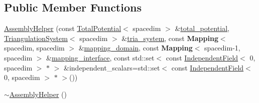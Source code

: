 \subsection*{Public Member Functions}
\begin{DoxyCompactItemize}
\item 
\hyperlink{class_assembly_helper_ae164448dcc5e9e8d2849c354212d6df5}{Assembly\+Helper} (const \hyperlink{class_total_potential}{Total\+Potential}$<$ spacedim $>$ \&\hyperlink{class_assembly_helper_a748eed9d73b7437a4bf2dcd73108790b}{total\+\_\+potential}, \hyperlink{class_triangulation_system}{Triangulation\+System}$<$ spacedim $>$ \&\hyperlink{class_assembly_helper_add08a8a7bb9c9325fcc7d92bfce525d4}{tria\+\_\+system}, const {\bf Mapping}$<$ spacedim, spacedim $>$ \&\hyperlink{class_assembly_helper_a3fbb49461000dea8f64266f830709fad}{mapping\+\_\+domain}, const {\bf Mapping}$<$ spacedim-\/1, spacedim $>$ \&\hyperlink{class_assembly_helper_a055fde6217c18e62cd80188d0130c201}{mapping\+\_\+interface}, const std\+::set$<$ const \hyperlink{class_independent_field}{Independent\+Field}$<$ 0, spacedim $>$ $\ast$ $>$ \&independent\+\_\+scalars=std\+::set$<$ const \hyperlink{class_independent_field}{Independent\+Field}$<$ 0, spacedim $>$ $\ast$ $>$())
\item 
\hyperlink{class_assembly_helper_ac82eca7b04aedf772028c6ff77245e9b}{$\sim$\+Assembly\+Helper} ()
\end{DoxyCompactItemize}

